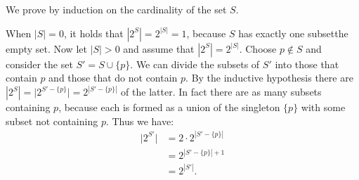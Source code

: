 We prove by induction on the cardinality of the set $S$.

When $|S|=0$, it holds that $|2^S|=2^{|S|}=1$, because $S$ has exactly one subset\dash the empty set.
Now let $|S|>0$ and assume that $|2^S|=2^{|S|}$.
Choose $p\notin S$ and consider the set $S'=S\cup\{p\}$.
We can divide the subsets of $S'$ into those that contain $p$ and those that do not contain $p$.
By the inductive hypothesis there are $|2^S|=\bigl|2^{S'-\{p\}}\bigr|=2^{|S'-\{p\}|}$ of the latter.
In fact there are as many subsets containing $p$, because each is formed as a union of the singleton $\{p\}$ with some subset not containing $p$.
Thus we have:
\begin{align*}
    \bigl|2^{S'}\bigr| &= 2\cdot2^{|S'-\{p\}|} \\
    &= 2^{|S'-\{p\}|+1} \\
    &= 2^{|S'|}.
\end{align*}
